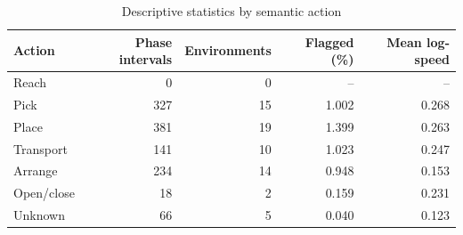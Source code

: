 \begin{table}[htbp]
\centering
\small
\caption{Descriptive statistics by semantic action}
\label{tab:semantic_desc}
\setlength{\tabcolsep}{4pt}
\begin{tabular}{lrrrr}
\toprule
Action & Phase intervals & Environments & Flagged (\%) & Mean log-speed\\
\midrule
Reach & 0 & 0 & -- & --\\
Pick & 327 & 15 & 1.002 & 0.268\\
Place & 381 & 19 & 1.399 & 0.263\\
Transport & 141 & 10 & 1.023 & 0.247\\
Arrange & 234 & 14 & 0.948 & 0.153\\
Open/close & 18 & 2 & 0.159 & 0.231\\
Unknown & 66 & 5 & 0.040 & 0.123\\
\bottomrule
\end{tabular}
\end{table}
